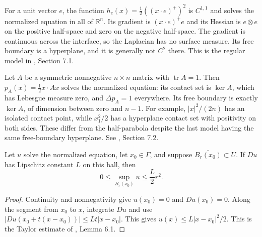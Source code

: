 \begin{example}\label{ex:obstacle-half-parabola}
For a unit vector $e$, the function $h_e(x)=\frac12((x\cdot e)^+)^2$ is $C^{1,1}$ and solves the normalized equation in all of $\mathbb R^n$. Its gradient is $(x\cdot e)^+e$ and its Hessian is $e\otimes e$ on the positive half-space and zero on the negative half-space. The gradient is continuous across the interface, so the Laplacian has no surface measure. Its free boundary is a hyperplane, and it is generally not $C^2$ there. This is the regular model in \cite{Fig18}, Section 7.1.
\end{example}

\begin{example}\label{ex:obstacle-quadratic-model}
Let $A$ be a symmetric nonnegative $n\times n$ matrix with $\operatorname{tr}A=1$. Then $p_A(x)=\frac12x\cdot Ax$ solves the normalized equation: its contact set is $\ker A$, which has Lebesgue measure zero, and $\Delta p_A=1$ everywhere. Its free boundary is exactly $\ker A$, of dimension between zero and $n-1$. For example, $|x|^2/(2n)$ has an isolated contact point, while $x_1^2/2$ has a hyperplane contact set with positivity on both sides. These differ from the half-parabola despite the last model having the same free-boundary hyperplane. See \cite{Fig18}, Section 7.2.
\end{example}

\begin{proposition}\label{prop:obstacle-upper-growth}
Let $u$ solve the normalized equation, let $x_0\in\Gamma$, and suppose $\overline{B_r(x_0)}\subset U$. If $Du$ has Lipschitz constant $L$ on this ball, then
\[
 0\leq\sup_{B_r(x_0)}u\leq\frac L2r^2.
\]
\end{proposition}
\begin{proof}
Continuity and nonnegativity give $u(x_0)=0$ and $Du(x_0)=0$. Along the segment from $x_0$ to $x$, integrate $Du$ and use $|Du(x_0+t(x-x_0))|\leq Lt|x-x_0|$. This gives $u(x)\leq L|x-x_0|^2/2$. This is the Taylor estimate of \cite{Fig18}, Lemma 6.1.
\end{proof}

